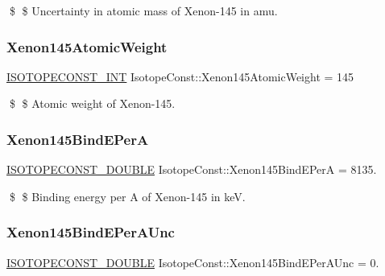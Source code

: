 \$ \$ Uncertainty in atomic mass of Xenon-\/145 in amu. \mbox{\label{group___isotope_const-_xenon-_xe145_ga1e9fef62f46fb3b12b55c3e1479d4f3a}} 
\subsubsection{\texorpdfstring{Xenon145\+Atomic\+Weight}{Xenon145AtomicWeight}}
{\footnotesize\ttfamily \mbox{\hyperlink{group___isotope_const-_macros_ga5f18360b3e99483a35c32d789e62621c}{I\+S\+O\+T\+O\+P\+E\+C\+O\+N\+S\+T\+\_\+\+I\+NT}} Isotope\+Const\+::\+Xenon145\+Atomic\+Weight = 145}

\$ \$ Atomic weight of Xenon-\/145. \mbox{\label{group___isotope_const-_xenon-_xe145_gab4a57c632b0ba3b25a3f6bc6139b22df}} 
\subsubsection{\texorpdfstring{Xenon145\+Bind\+E\+PerA}{Xenon145BindEPerA}}
{\footnotesize\ttfamily \mbox{\hyperlink{group___isotope_const-_macros_ga8f45a7272ce02c0b4c65c44636ed719a}{I\+S\+O\+T\+O\+P\+E\+C\+O\+N\+S\+T\+\_\+\+D\+O\+U\+B\+LE}} Isotope\+Const\+::\+Xenon145\+Bind\+E\+PerA = 8135.}

\$ \$ Binding energy per A of Xenon-\/145 in keV. \mbox{\label{group___isotope_const-_xenon-_xe145_gad69c9e54f2d24b2015c3bed014a5a6a2}} 
\subsubsection{\texorpdfstring{Xenon145\+Bind\+E\+Per\+A\+Unc}{Xenon145BindEPerAUnc}}
{\footnotesize\ttfamily \mbox{\hyperlink{group___isotope_const-_macros_ga8f45a7272ce02c0b4c65c44636ed719a}{I\+S\+O\+T\+O\+P\+E\+C\+O\+N\+S\+T\+\_\+\+D\+O\+U\+B\+LE}} Isotope\+Const\+::\+Xenon145\+Bind\+E\+Per\+A\+Unc = 0.}

